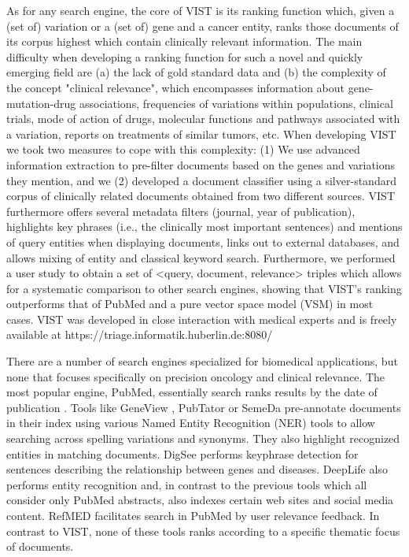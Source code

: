 As for any search engine, the core of VIST is its ranking function which, given a (set of) variation or a (set of) gene and a cancer entity, ranks those documents of its corpus highest which contain clinically relevant information. The main difficulty when developing a ranking function for such a novel and quickly emerging field are (a) the lack of gold standard data and (b) the complexity of the concept "clinical relevance", which encompasses information about gene-mutation-drug associations, frequencies of variations within populations, clinical trials, mode of action of drugs, molecular functions and pathways associated with a variation, reports on treatments of similar tumors, etc. When developing VIST we took two measures to cope with this complexity: (1) We use advanced information extraction to pre-filter documents based on the genes and variations they mention, and we (2) developed a document classifier using a silver-standard corpus of clinically related documents obtained from two different sources. VIST furthermore offers several metadata filters (journal, year of publication), highlights key phrases (i.e., the clinically most important sentences) and mentions of query entities when displaying documents, links out to external databases, and allows mixing of entity and classical keyword search. Furthermore, we performed a user study to obtain a set of <query, document, relevance> triples which allows for a systematic comparison to other search engines, showing that VIST’s ranking outperforms that of PubMed and a pure vector space model (VSM) in most cases. VIST was developed in close interaction with medical experts and is freely available at https://triage.informatik.huberlin.de:8080/

There are a number of search engines specialized for biomedical applications, but none that focuses specifically on precision oncology and clinical relevance. The most popular engine, PubMed, essentially search ranks results by the date of publication \cite{Fiorini2017}. Tools like GeneView \cite{Thomas2012}, PubTator \cite{Wei2013a} or SemeDa \cite{Kohler2003} pre-annotate documents in their index using various Named Entity Recognition (NER) tools to allow searching across spelling variations and synonyms. They also highlight recognized entities in matching documents. DigSee \cite{Kim2013} performs keyphrase detection for sentences describing the relationship between genes and diseases. DeepLife \cite{Ernst} also performs entity recognition and, in contrast to the previous tools which all consider only PubMed abstracts, also indexes certain web sites and social media content. RefMED \cite{Yu2009} facilitates search in PubMed by user relevance feedback. In contrast to VIST, none of these tools ranks according to a specific thematic focus of documents.


